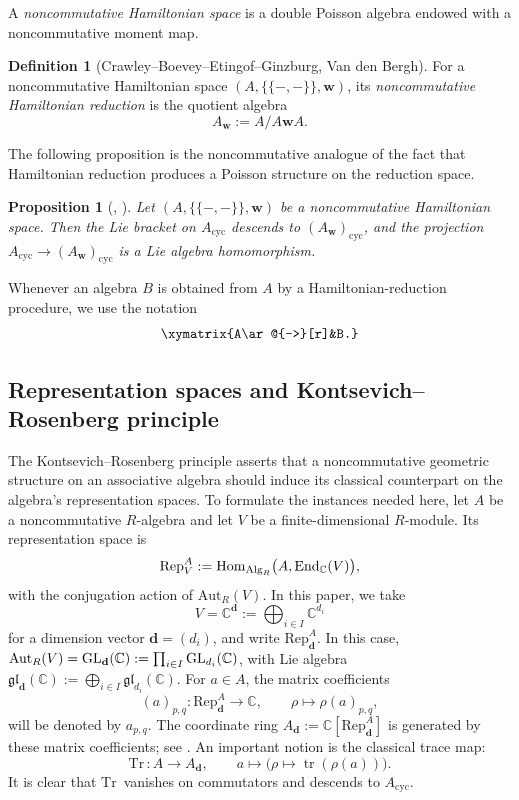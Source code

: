 \documentclass[11pt,reqno]{amsart}
\newtheorem{proposition}[theorem]{Proposition}
\theoremstyle{definition}
\newtheorem{definition}[theorem]{Definition}
\newcommand{\bbC}{\mathbb{C}}
\newcommand{\gl}{\mathfrak{gl}}
\newcommand{\GL}{\mathrm{GL}}
\newcommand{\tos}{\mapsto}
\newcommand{\Hom}{\mathrm{Hom}}
\newcommand{\End}{\mathrm{End}}
\newcommand{\Alg}{ {\rm Alg}}
\newcommand{\Rep}{\mathrm{Rep}}
\newcommand{\Tr}{\mathrm{Tr} \,}
\newcommand{\bd}{\mathbf{d}}
\newcommand{\ldb}{\mathopen{\{\!\!\{}}
\newcommand{\rdb}{\mathclose{\}\!\!\}}}
\newcommand{\bw}{\mathbf{w}}
\newcommand{\cyc}{\mathrm{cyc}}
\begin{document}
A \emph{noncommutative Hamiltonian space} is a double Poisson algebra endowed with a noncommutative moment map.

\begin{definition}[Crawley--Boevey--Etingof--Ginzburg, Van den Bergh]\label{def: nc ham red}
For a noncommutative Hamiltonian space \((A,\ldb-,-\rdb,\bw)\), its \emph{noncommutative Hamiltonian reduction} is the quotient algebra
\[
A_\bw:=A/A\bw A.
\]
\end{definition}

The following proposition is the 
noncommutative analogue of the fact that Hamiltonian 
reduction produces a Poisson structure on the reduction 
space.

\begin{proposition}
[{\cite[Proposition~2.6.5]{Van2008Double}, \cite[Theorem 7.2.3]{CBEG2007}}]
\label{prop: noncom red}
Let \((A,\ldb-,-\rdb,\bw)\) be a noncommutative 
Hamiltonian space.
Then the Lie bracket on \(A_\cyc\) descends to 
\((A_\bw)_\cyc\), and the projection 
\(A_\cyc\to(A_\bw)_\cyc\) is a Lie algebra homomorphism.
\end{proposition}

Whenever an algebra \(B\) is obtained from \(A\) by a Hamiltonian-reduction procedure, we use the notation
\[
\xymatrix{A\ar@{-->}[r]&B.}
\]

\subsection{Representation spaces
and Kontsevich--Rosenberg principle}

The Kontsevich--Rosenberg principle asserts that a noncommutative geometric structure on an associative algebra should induce its classical counterpart on the algebra's representation spaces.
To formulate the instances needed here, let \(A\) be a noncommutative \(R\)-algebra and let \(V\) be a finite-dimensional \(R\)-module.
Its representation space is
\[
\Rep^A _V:=\Hom_{\Alg_R} \bigl(A,\End_{\bbC}(V)\bigr),
\]
{with the conjugation action of \( \mathrm{Aut}_R (V)\).}
In this paper, we take
\[
V=\bbC^\bd:=\bigoplus_{i\in I}\bbC^{d_i}
\]
for a dimension vector \(\bd=(d_i)\), and write \(\Rep^A_\bd\).
In this case, \({\rm Aut}_R (V) = \GL_\bd(\bbC):=\prod_{i\in I}\GL_{d_i}(\bbC)\), with Lie algebra \(\gl_\bd(\bbC):=\bigoplus_{i\in I}\gl_{d_i}(\bbC)\).
For \(a\in A\), the matrix coefficients
\[
(a)_{p,q}\colon \Rep^A_\bd\to \bbC,
\qquad
\rho\tos \rho(a)_{p,q},
\]
will be denoted by \(a_{p,q}\).
The coordinate ring \(A_\bd:=\bbC[\Rep^A_\bd]\) is generated by these matrix coefficients; see \cite[Proposition~12.1.6]{Gin2005non}.
An important notion is the {classical trace map}:
\[
\Tr:
A
\longrightarrow
A_\bd,
\qquad
a\longmapsto
\bigl( \rho \longmapsto \operatorname{tr} ( \rho(a) )\bigr).
\]
It is clear that \(\Tr\) vanishes on commutators and descends to \(A_\cyc\).
\end{document}
